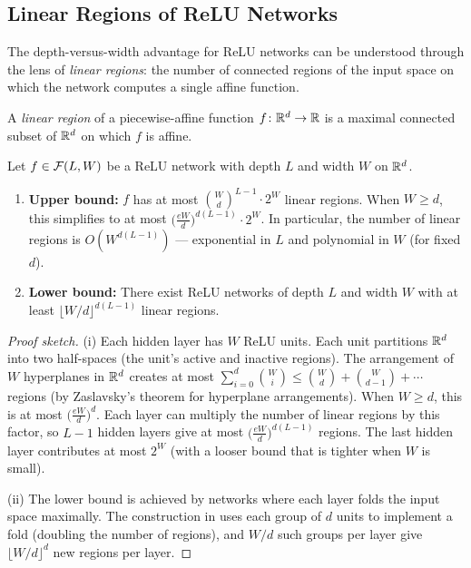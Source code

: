 \documentclass[11pt,a4paper]{article}
\begin{document}
\subsection{Linear Regions of ReLU Networks}

The depth-versus-width advantage for ReLU networks can be understood
through the lens of \emph{linear regions}: the number of connected
regions of the input space on which the network computes a single
affine function.

\begin{definition}
\label{def:linear-region}
A \emph{linear region} of a piecewise-affine function $f \colon
\mathbb{R}^d \to \mathbb{R}$ is a maximal connected subset of $\mathbb{R}^d$ on which $f$ is
affine.
\end{definition}

\begin{theorem}
\label{thm:linear-regions}
Let $f \in \mathcal{F}(L, W)$ be a ReLU network with depth $L$ and width
$W$ on $\mathbb{R}^d$.
\begin{enumerate}[nosep,label=(\roman*)]
  \item \textbf{Upper bound:} $f$ has at most
    $\binom{W}{d}^{L-1} \cdot 2^W$ linear regions.  When $W \ge d$,
    this simplifies to at most $\bigl( \frac{eW}{d} \bigr)^{d(L-1)}
    \cdot 2^W$.  In particular, the number of linear regions is
    $O(W^{d(L-1)})$ --- exponential in $L$ and polynomial in $W$
    (for fixed $d$).
  \item \textbf{Lower bound:} There exist ReLU networks of depth $L$
    and width $W$ with at least $\lfloor W/d \rfloor^{d(L-1)}$
    linear regions.
\end{enumerate}
\end{theorem}

\begin{proof}[Proof sketch]
(i) Each hidden layer has $W$ ReLU units.  Each unit partitions
$\mathbb{R}^d$ into two half-spaces (the unit's active and inactive regions).
The arrangement of $W$ hyperplanes in $\mathbb{R}^d$ creates at most
$\sum_{i=0}^{d} \binom{W}{i} \le \binom{W}{d} + \binom{W}{d-1} +
\cdots$ regions (by Zaslavsky's theorem for hyperplane arrangements).
When $W \ge d$, this is at most $\bigl( \frac{eW}{d} \bigr)^d$.  Each
layer can multiply the number of linear regions by this factor, so
$L - 1$ hidden layers give at most $\bigl( \frac{eW}{d} \bigr)^{d(L-1)}$
regions.  The last hidden layer contributes at most $2^W$ (with a
looser bound that is tighter when $W$ is small).

(ii) The lower bound is achieved by networks where each layer folds
the input space maximally.  The construction in \citet{montufar2014}
uses each group of $d$ units to implement a fold (doubling the number
of regions), and $W/d$ such groups per layer give $\lfloor W/d
\rfloor^d$ new regions per layer.
\end{proof}
\end{document}
